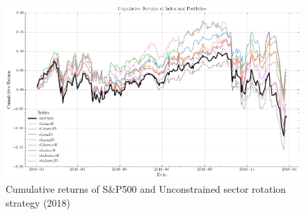 



\begin{figure}[H]
    \centering
    \includegraphics[width=\textwidth]{plots/results/cum_ret_plot.png}
    \caption{Cumulative returns of S\&P500 and Unconstrained sector rotation strategy (2018)}\label{fig:cum_ret_plot}
\end{figure}



